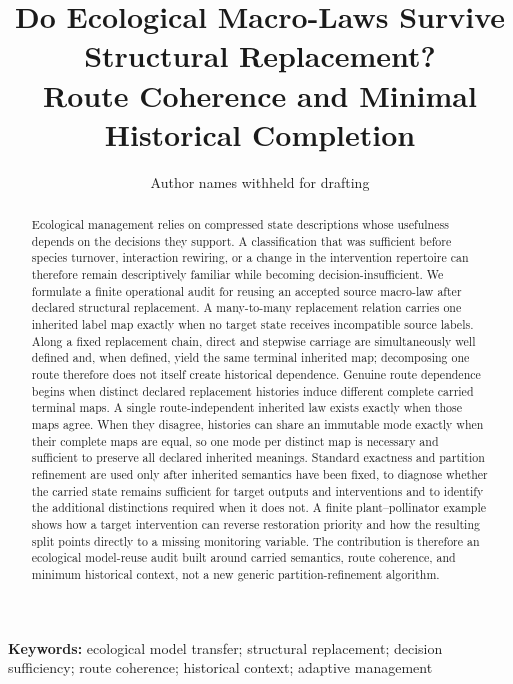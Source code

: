 \documentclass[11pt]{article}
\title{Do Ecological Macro-Laws Survive Structural Replacement?\\Route Coherence and Minimal Historical Completion}
\author{Author names withheld for drafting}
\date{}
\begin{document}
\maketitle

\begin{abstract}
Ecological management relies on compressed state descriptions whose usefulness depends on the decisions they support. A classification that was sufficient before species turnover, interaction rewiring, or a change in the intervention repertoire can therefore remain descriptively familiar while becoming decision-insufficient. We formulate a finite operational audit for reusing an accepted source macro-law after declared structural replacement. A many-to-many replacement relation carries one inherited label map exactly when no target state receives incompatible source labels. Along a fixed replacement chain, direct and stepwise carriage are simultaneously well defined and, when defined, yield the same terminal inherited map; decomposing one route therefore does not itself create historical dependence. Genuine route dependence begins when distinct declared replacement histories induce different complete carried terminal maps. A single route-independent inherited law exists exactly when those maps agree. When they disagree, histories can share an immutable mode exactly when their complete maps are equal, so one mode per distinct map is necessary and sufficient to preserve all declared inherited meanings. Standard exactness and partition refinement are used only after inherited semantics have been fixed, to diagnose whether the carried state remains sufficient for target outputs and interventions and to identify the additional distinctions required when it does not. A finite plant--pollinator example shows how a target intervention can reverse restoration priority and how the resulting split points directly to a missing monitoring variable. The contribution is therefore an ecological model-reuse audit built around carried semantics, route coherence, and minimum historical context, not a new generic partition-refinement algorithm.
\end{abstract}

\noindent\textbf{Keywords:} ecological model transfer; structural replacement; decision sufficiency; route coherence; historical context; adaptive management
\end{document}

